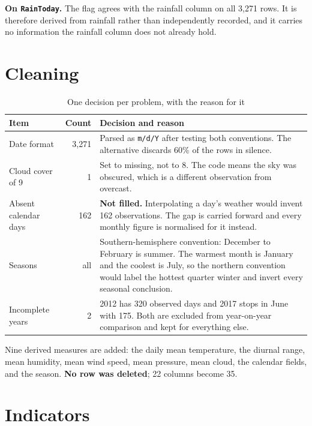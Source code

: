\documentclass[12pt,a4paper]{article}
\newcommand{\F}[1]{\texttt{\small #1}}
\begin{document}
\textbf{On \F{RainToday}.} The flag agrees with the rainfall column on all 3{,}271
rows. It is therefore derived from rainfall rather than independently recorded, and
it carries no information the rainfall column does not already hold.

\section{Cleaning}

\begin{table}[htbp]\centering
\caption{One decision per problem, with the reason for it}
\small
\begin{tabularx}{\linewidth}{@{}l r L@{}}
\toprule
\textbf{Item} & \textbf{Count} & \textbf{Decision and reason} \\
\midrule
Date format & 3{,}271 &
Parsed as \F{m/d/Y} after testing both conventions. The alternative discards 60\% of
the rows in silence. \\[3pt]
Cloud cover of 9 & 1 &
Set to missing, not to 8. The code means the sky was obscured, which is a different
observation from overcast. \\[3pt]
Absent calendar days & 162 &
\textbf{Not filled.} Interpolating a day's weather would invent 162 observations.
The gap is carried forward and every monthly figure is normalised for it instead. \\[3pt]
Seasons & all &
Southern-hemisphere convention: December to February is summer. The warmest month is
January and the coolest is July, so the northern convention would label the hottest
quarter winter and invert every seasonal conclusion. \\[3pt]
Incomplete years & 2 &
2012 has 320 observed days and 2017 stops in June with 175. Both are excluded from
year-on-year comparison and kept for everything else. \\
\bottomrule
\end{tabularx}
\end{table}

Nine derived measures are added: the daily mean temperature, the diurnal range, mean
humidity, mean wind speed, mean pressure, mean cloud, the calendar fields, and the
season. \textbf{No row was deleted}; 22 columns become 35.

\section{Indicators}
\end{document}
